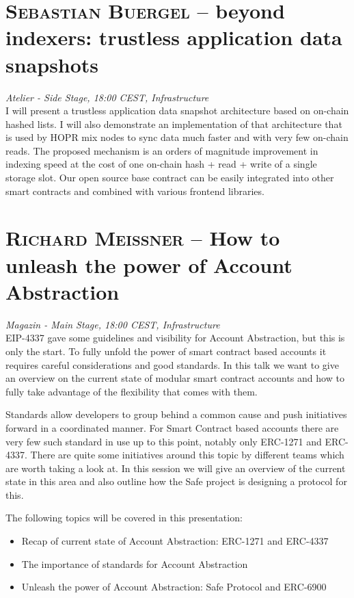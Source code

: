 \section {\textsc{Sebastian Buergel} -- beyond indexers: trustless application data snapshots
} \noindent \textit {Atelier - Side Stage, 18:00 CEST, Infrastructure
}\\[1em] I will present a trustless application data snapshot architecture based on on-chain hashed lists. I will also demonstrate an implementation of that architecture that is used by HOPR mix nodes to sync data much faster and with very few on-chain reads. The proposed mechanism is an orders of magnitude improvement in indexing speed at the cost of one on-chain hash + read + write of a single storage slot. Our open source base contract can be easily integrated into other smart contracts and combined with various frontend libraries.
\clearpage
\section {\textsc{Richard Meissner} -- How to unleash the power of Account Abstraction
} \noindent \textit {Magazin - Main Stage, 18:00 CEST, Infrastructure
}\\[1em] EIP-4337 gave some guidelines and visibility for Account Abstraction, but this is only the start. To fully unfold the power of smart contract based accounts it requires careful considerations and good standards. In this talk we want to give an overview on the current state of modular smart contract accounts and how to fully take advantage of the flexibility that comes with them.
\par Standards allow developers to group behind a common cause and push initiatives forward in a coordinated manner. For Smart Contract based accounts there are very few such standard in use up to this point, notably only ERC-1271 and ERC-4337. There are quite some initiatives around this topic by different teams which are worth taking a look at. In this session we will give an overview of the current state in this area and also outline how the Safe project is designing a protocol for this.

The following topics will be covered in this presentation:
\begin{itemize}
\item Recap of current state of Account Abstraction: ERC-1271 and ERC-4337
\item The importance of standards for Account Abstraction
\item Unleash the power of Account Abstraction: Safe Protocol and ERC-6900
\end{itemize}
\clearpage
